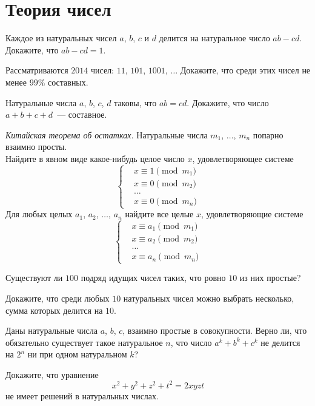 

\section*{Теория чисел}


\begin{problems}

\item
Каждое из натуральных чисел $a$, $b$, $c$ и $d$ делится на натуральное число
$a b - c d$.
Докажите, что $a b - c d = 1$.

\item
Рассматриваются $2014$ чисел: $11$, $101$, $1001$, $\ldots$
Докажите, что среди этих чисел не менее $99\%$ составных.

\item
Натуральные числа $a$, $b$, $c$, $d$ таковы, что $a b = c d$.
Докажите, что число $a + b + c + d$~--- составное.

\item\emph{Китайская теорема об остатках.}
Натуральные числа $m_1$, $\ldots$, $m_n$ попарно взаимно просты.
\\
\sbp
Найдите в явном виде какое-нибудь целое число $x$, удовлетворяющее системе
\[ \left\{ \begin{aligned} &
    x \equiv 1 \pmod{m_1}
\\ &
    x \equiv 0 \pmod{m_2}
\\ &
    \ldots
\\ &
    x \equiv 0 \pmod{m_n}
\end{aligned} \right. \]
\sbp
Для любых целых $a_1$, $a_2$, $\ldots$, $a_n$ найдите все целые $x$,
удовлетворяющие системе
\[ \left\{ \begin{aligned} &
    x \equiv a_1 \pmod{m_1}
\\ &
    x \equiv a_2 \pmod{m_2}
\\ &
    \ldots
\\ &
    x \equiv a_n \pmod{m_n}
\end{aligned} \right. \]

\item
Существуют ли $100$ подряд идущих чисел таких, что ровно $10$ из них простые?

\item
Докажите, что среди любых $10$ натуральных чисел можно выбрать несколько, сумма
которых делится на $10$.

\item
Даны натуральные числа $a$, $b$, $c$, взаимно простые в совокупности.
Верно ли, что обязательно существует такое натуральное $n$, что число
$a^k + b^k + c^k$ не делится на $2^n$ ни при одном натуральном $k$?

\item
Докажите, что уравнение
\[
    x^2 + y^2 + z^2 + t^2 = 2 x y z t
\]
не имеет решений в натуральных числах.

\end{problems}

